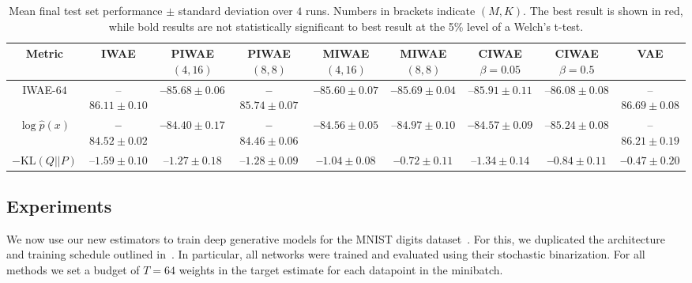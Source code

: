 \begin{table}[t!]                        
	\centering    
	\scriptsize             
	\setlength\tabcolsep{2.5pt}	  
	\renewcommand{\arraystretch}{1.2}          
	\caption{Mean final test set performance $\pm$ standard deviation over $4$ runs. Numbers in brackets indicate $(M,K)$.
		The best result is shown in red, while bold results are not
		statistically significant to best result at the 5\% level of a Welch's t-test. \vspace{-8pt} \label{table:final-pef}}                    
	\begin{tabular}{|c|cccccccc|}                    
		\hline                                                       
		Metric & \gls{IWAE} & \gls{PIWAE} $(4,16)$ & \gls{PIWAE} $(8,8)$ & 
		\gls{MIWAE} $(4,16)$ & \gls{MIWAE} $(8,8)$ & \gls{CIWAE} $\beta=0.05$ & \gls{CIWAE} $\beta=0.5$ & \gls{VAE}     \\
		\hline    
		\gls{IWAE}-$64$ 
		& --$86.11\pm 0.10$ 
		& {\bf--}$\mathbf{85.68\pm 0.06}$ & {\bf--}$\mathbf{85.74\pm 0.07}$ 
		& {\color{red} \bf --$\mathbf{85.60\pm 0.07}$} & {\bf--}$\mathbf{85.69\pm 0.04}$ 
		& --$85.91\pm 0.11$ & --$86.08\pm 0.08$  
		& --$86.69\pm 0.08$ \\ 
		$\log \hat{p}(x)$ 
		& {\bf--}$\mathbf{84.52\pm 0.02}$  
		& {\color{red} \bf --$\mathbf{84.40\pm 0.17}$} 	& {\bf--}$\mathbf{84.46\pm 0.06}$ 
		& {\bf--}$\mathbf{84.56\pm 0.05}$ & --$84.97\pm 0.10$	 
		& 	{\bf--}$\mathbf{84.57\pm 0.09}$ & --$85.24\pm 0.08$  
		& --$86.21\pm 0.19$ \\ 
		$-\mathrm{KL}(Q|| P)$ 
		& --$1.59\pm 0.10$ 
		& --$1.27\pm 0.18$ & --$1.28\pm 0.09$ 
		& {\bf--}$\mathbf{1.04\pm 0.08}$ & {\bf--}$\mathbf{0.72\pm 0.11}$  
		& --$1.34\pm 0.14$ & {\bf--}$\mathbf{0.84\pm 0.11}$ 
		& {\color{red} \bf --$\mathbf{0.47\pm 0.20}$} \\ 
		\hline                                
	\end{tabular}                 
	\vspace{-12pt}                                           
\end{table} 

\subsection{Experiments}
\label{sec:exp-algs}

We now use our new estimators to train deep generative models for the MNIST digits 
dataset~\citep{lecun1998gradient}.  For this, we duplicated the 
architecture and
training schedule outlined in~\citet{burda2016importance}. In particular, all networks were trained and evaluated using their
 stochastic binarization.
For all methods we set a budget of $T=64$ weights in the target estimate
for each datapoint in the minibatch.  

